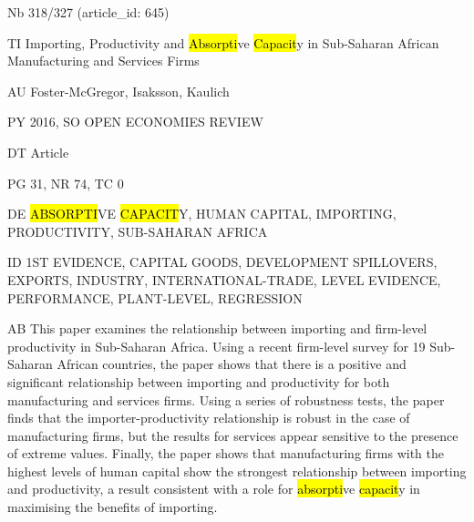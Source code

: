 \documentclass[a4paper]{article}
\begin{document}
\vspace*{-2cm}
Nb \tabto{0cm}318/327 (article\_id: 645)\par
TI \tabto{0cm}Importing, Productivity and \hl{Absorpti}ve \hl{Capacit}y in Sub-Saharan African Manufacturing and Services Firms\par
AU \tabto{0cm}Foster-McGregor, Isaksson, Kaulich\par
PY \tabto{0cm}2016, SO OPEN ECONOMIES REVIEW\par
DT \tabto{0cm}Article\par
PG \tabto{0cm}31, NR 74, TC 0\par
DE \tabto{0cm}\hl{ABSORPTI}VE \hl{CAPACIT}Y, HUMAN CAPITAL, IMPORTING, PRODUCTIVITY, SUB-SAHARAN AFRICA\par
ID \tabto{0cm}1ST EVIDENCE, CAPITAL GOODS, DEVELOPMENT SPILLOVERS, EXPORTS, INDUSTRY, INTERNATIONAL-TRADE, LEVEL EVIDENCE, PERFORMANCE, PLANT-LEVEL, REGRESSION\par
AB \tabto{0cm}This paper examines the relationship between importing and firm-level productivity in Sub-Saharan Africa. Using a recent firm-level survey for 19 Sub-Saharan African countries, the paper shows that there is a positive and significant relationship between importing and productivity for both manufacturing and services firms. Using a series of robustness tests, the paper finds that the importer-productivity relationship is robust in the case of manufacturing firms, but the results for services appear sensitive to the presence of extreme values. Finally, the paper shows that manufacturing firms with the highest levels of human capital show the strongest relationship between importing and productivity, a result consistent with a role for \hl{absorpti}ve \hl{capacit}y in maximising the benefits of importing.\par
\clearpage
\end{document}
